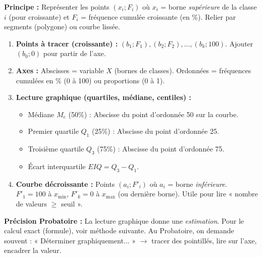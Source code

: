 \documentclass[11pt]{article}
\begin{document}
\begin{methode}
    \textbf{Principe :} Représenter les points $(x_i; F_i)$ où $x_i$ = borne \emph{supérieure} de la classe $i$ (pour croissante) et $F_i$ = fréquence cumulée croissante (en \%). Relier par segments (polygone) ou courbe lissée.
    \begin{enumerate}
        \item \textbf{Points à tracer (croissante) :} $(b_1; F_1), (b_2; F_2), \ldots, (b_k; 100)$. Ajouter $(b_0; 0)$ pour partir de l'axe.
        \item \textbf{Axes :} Abscisses = variable $X$ (bornes de classes). Ordonnées = fréquences cumulées en \% (0 à 100) ou proportions (0 à 1).
        \item \textbf{Lecture graphique (quartiles, médiane, centiles) :}
        \begin{itemize}
            \item Médiane $M_e$ (50\%) : Abscisse du point d'ordonnée 50 sur la courbe.
            \item Premier quartile $Q_1$ (25\%) : Abscisse du point d'ordonnée 25.
            \item Troisième quartile $Q_3$ (75\%) : Abscisse du point d'ordonnée 75.
            \item Écart interquartile $EIQ = Q_3 - Q_1$.
        \end{itemize}
        \item \textbf{Courbe décroissante :} Points $(a_i; F'_i)$ où $a_i$ = borne \emph{inférieure}. $F'_1=100$ à $x_{\min}$, $F'_k=0$ à $x_{\max}$ (ou dernière borne). Utile pour lire « nombre de valeurs $\ge$ seuil ».
    \end{enumerate}
    \textbf{Précision Probatoire :} La lecture graphique donne une \emph{estimation}. Pour le calcul exact (formule), voir méthode suivante. Au Probatoire, on demande souvent : « Déterminer graphiquement... » $\rightarrow$ tracer des pointillés, lire sur l'axe, encadrer la valeur.
\end{methode}
\end{document}
